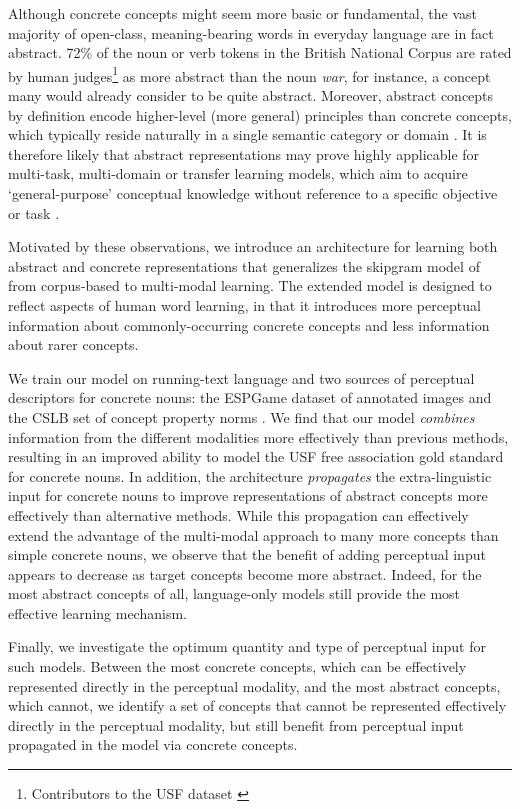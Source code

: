 \documentclass[11pt]{article}
\begin{document}
Although concrete concepts might seem more basic or fundamental, the vast majority of open-class, meaning-bearing words in everyday language are in fact abstract. 72\% of the noun or verb tokens in the British National Corpus \cite{leech1994claws4} are rated by human judges\footnote{Contributors to the USF dataset \cite{nelson2004university}} as more abstract than the noun \emph{war}, for instance, a concept many would already consider to be quite abstract. Moreover, abstract concepts by definition encode higher-level (more general) principles than concrete concepts, which typically reside naturally in a single semantic category or domain \cite{crutch2005abstract}. It is therefore likely that abstract representations may prove highly applicable for multi-task, multi-domain or transfer learning models, which aim to acquire `general-purpose' conceptual knowledge without reference to a specific objective or task \cite{collobert2008unified,mesnil2012unsupervised}. 

Motivated by these observations, we introduce an architecture for learning both abstract and concrete representations that generalizes the skipgram model of  from corpus-based  to multi-modal learning. The extended model is designed to reflect aspects of human word learning, in that it introduces more perceptual information about commonly-occurring concrete concepts and less information about rarer concepts. 

We train our model on running-text language and two sources of perceptual descriptors for concrete nouns: the ESPGame dataset of annotated images \cite{von2004labeling} and the CSLB set of concept property norms \cite{devereux2013centre}. We find that our model \emph{combines} information from the different modalities more effectively than previous methods, resulting in an improved ability to model the USF free association gold standard \cite{nelson2004university} for concrete nouns. In addition, the architecture  \emph{propagates} the extra-linguistic input for concrete nouns to improve representations of abstract concepts more effectively than alternative methods. While this propagation can effectively extend the advantage of the multi-modal approach to many more concepts than simple concrete nouns, we observe that the benefit of adding perceptual input appears to decrease as target concepts become more abstract. Indeed, for the most abstract concepts of all, language-only models still provide the most effective learning mechanism.  

Finally, we investigate the optimum quantity and type of perceptual input for such models. Between the most concrete concepts, which can be effectively represented directly in the perceptual modality, and the most abstract concepts, which cannot, we identify a set of concepts that cannot be represented effectively directly in the perceptual modality, but still benefit from perceptual input propagated in the model via concrete concepts. 
\end{document}
